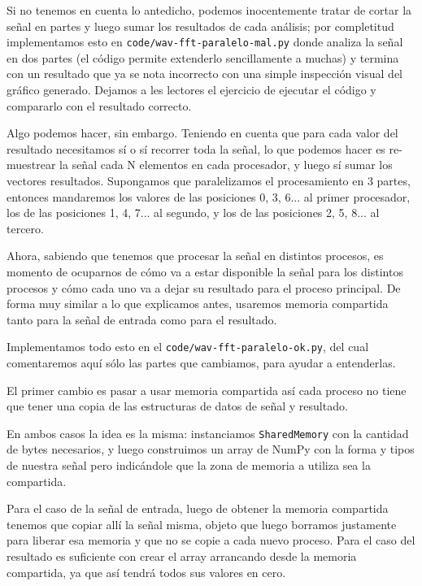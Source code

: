 Si no tenemos en cuenta lo antedicho, podemos inocentemente tratar de cortar la señal en partes y luego sumar los resultados de cada análisis; por completitud implementamos esto en \texttt{code/wav-fft-paralelo-mal.py} donde analiza la señal en dos partes (el código permite extenderlo sencillamente a muchas) y termina con un resultado que ya se nota incorrecto con una simple inspección visual del gráfico generado. Dejamos a les lectores el ejercicio de ejecutar el código y compararlo con el resultado correcto.

Algo podemos hacer, sin embargo. Teniendo en cuenta que para cada valor del resultado necesitamos sí o sí recorrer toda la señal, lo que podemos hacer es re-muestrear la señal cada N elementos en cada procesador, y luego sí sumar los vectores resultados. Supongamos que paralelizamos el procesamiento en 3 partes, entonces mandaremos los valores de las posiciones 0, 3, 6... al primer procesador, los de las posiciones 1, 4, 7... al segundo, y los de las posiciones 2, 5, 8... al tercero. 

Ahora, sabiendo que tenemos que procesar la señal en distintos procesos, es momento de ocuparnos de cómo va a estar disponible la señal para los distintos procesos y cómo cada uno va a dejar su resultado para el proceso principal. De forma muy similar a lo que explicamos antes, usaremos memoria compartida tanto para la señal de entrada como para el resultado.

Implementamos todo esto en el \texttt{code/wav-fft-paralelo-ok.py}, del cual comentaremos aquí sólo las partes que cambiamos, para ayudar a entenderlas.


El primer cambio es pasar a usar memoria compartida así cada proceso no tiene que tener una copia de las estructuras de datos de señal y resultado. 

En ambos casos la idea es la misma: instanciamos \texttt{SharedMemory} con la cantidad de bytes necesarios, y luego construimos un array de NumPy con la forma y tipos de nuestra señal pero indicándole que la zona de memoria a utiliza sea la compartida. 

Para el caso de la señal de entrada, luego de obtener la memoria compartida tenemos que copiar allí la señal misma, objeto que luego borramos justamente para liberar esa memoria y que no se copie a cada nuevo proceso. Para el caso del resultado es suficiente con crear el array arrancando desde la memoria compartida, ya que así tendrá todos sus valores en cero.

